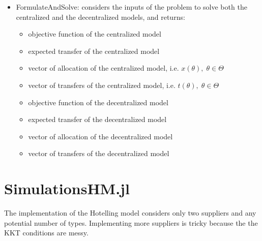\documentclass[11pt, oneside]{article}
\begin{document}
\begin{itemize}
  \item FormulateAndSolve: considers the inputs of the problem to solve both the centralized and
  the decentralized models, and returns:
  \begin{itemize}
    \item objective function of the centralized model
    \item expected transfer of the centralized model
    \item vector of allocation of the centralized model, i.e. \(x(\theta), \; \theta \in \Theta\)
    \item vector of transfers of the centralized model, i.e. \(t(\theta), \; \theta \in \Theta\)
    \item objective function of the decentralized model
    \item expected transfer of the decentralized model
    \item vector of allocation of the decentralized model
    \item vector of transfers of the decentralized model
  \end{itemize}
\end{itemize}

\section{SimulationsHM.jl}
The implementation of the Hotelling model considers only two suppliers and any potential
number of types. Implementing more suppliers is tricky because the the KKT
conditions are messy.
\end{document}
